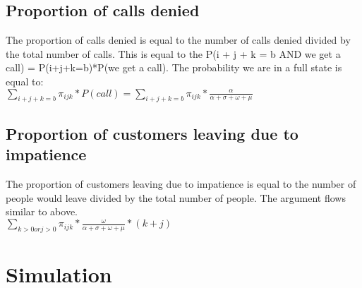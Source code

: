 \documentclass[10pt,a4paper]{article}
\begin{document}
\subsection{Proportion of calls denied}
The proportion of calls denied is equal to the number of calls denied divided by the total number of calls. This is equal to the P(i + j + k = b AND we get a call) = P(i+j+k=b)*P(we get a call). The probability we are in a full state is equal to:\\
$\sum\limits_{i+j+k = b} \pi_{ijk}*P(call) = \sum\limits_{i+j+k = b} \pi_{ijk}*\frac{\alpha}{\alpha + \sigma + \omega + \mu}$
\subsection{Proportion of customers leaving due to impatience}
The proportion of customers leaving due to impatience is equal to the number of people would leave divided by the total number of people. The argument flows similar to above.\\
$\sum\limits_{k > 0 or j > 0} \pi_{ijk}*\frac{\omega}{\alpha + \sigma + \omega + \mu}*(k+j)$
\section{Simulation}
\end{document}
